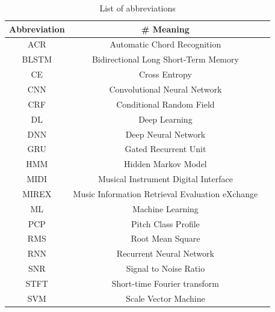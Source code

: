 \documentclass[a4paper]{article}
\begin{document}
\begin{table}[th]
\caption{List of abbreviations}
\label{tab:list_of_abbreviations}
\centering
\begin{adjustbox}{width=\columnwidth}
    
      
      \begin{tabular}{ |c|c|c|}
      \hline
        \multicolumn{1}{|c|}{\textbf{Abbreviation}} & 
        \multicolumn{1}{|c|}{\textbf{\# Meaning}}\\\hline
        ACR & \quad Automatic Chord Recognition  \\\hline
        BLSTM & \quad Bidirectional Long Short-Term Memory \\\hline
        CE & \quad Cross Entropy  \\\hline
        CNN & \quad Convolutional Neural Network  \\\hline
        CRF & \quad Conditional Random Field  \\\hline
        DL & \quad Deep Learning  \\\hline
        DNN & \quad Deep Neural Network  \\\hline
        GRU & \quad Gated Recurrent Unit  \\\hline
        HMM & \quad Hidden Markov Model  \\\hline
        MIDI  & \quad Musical Instrument Digital Interface \\\hline
        MIREX & \quad Music Information Retrieval Evaluation eXchange \\\hline
        ML & \quad Machine Learning  \\\hline
        PCP & \quad Pitch Class Profile  \\\hline
        RMS & \quad Root Mean Square  \\\hline
        RNN & \quad Recurrent Neural Network  \\\hline
        SNR & \quad Signal to Noise Ratio  \\\hline
        STFT & \quad Short-time Fourier transform  \\\hline
        SVM & \quad Scale Vector Machine  \\\hline
        
      \end{tabular}
    
\end{adjustbox}
\end{table}
\end{document}
